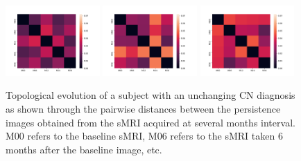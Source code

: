 \documentclass{article}
\begin{document}
\begin{figure}[htb]
  \centering \includegraphics[width=0.32\textwidth]{figures/temporal_evolution/ADNI011S0023_h_0.png}
  \hfill \includegraphics[width=0.32\textwidth]{figures/temporal_evolution/ADNI011S0023_h_1.png}
  \hfill
  \includegraphics[width=0.32\textwidth]{figures/temporal_evolution/ADNI011S0023_h_2.png} \caption{Topological
    evolution of a subject with an unchanging CN diagnosis as shown through the pairwise distances
    between the persistence images obtained from the sMRI acquired at several months interval. M00
    refers to the baseline sMRI, M06 refers to the sMRI taken 6 months after the baseline image, etc.}
  \label{fig:patient_evolution_stable}
\end{figure}
\end{document}
